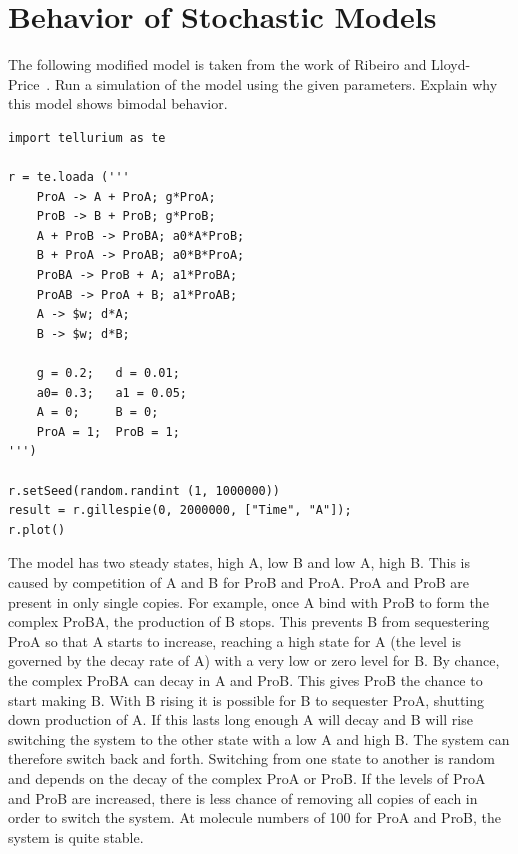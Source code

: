 \documentclass[12pt]{article}
\begin{document}


\section{Behavior of Stochastic Models}



\cprotEnv\begin{question}
The following modified model is taken from the work of Ribeiro and Lloyd-Price~\cite{ribeiro2007}. Run a simulation of the model using the given parameters. Explain why this model shows bimodal behavior.

\begin{verbatim}
import tellurium as te

r = te.loada ('''
    ProA -> A + ProA; g*ProA;
    ProB -> B + ProB; g*ProB;
    A + ProB -> ProBA; a0*A*ProB;
    B + ProA -> ProAB; a0*B*ProA;
    ProBA -> ProB + A; a1*ProBA;
    ProAB -> ProA + B; a1*ProAB;
    A -> $w; d*A;
    B -> $w; d*B;

    g = 0.2;   d = 0.01;
    a0= 0.3;   a1 = 0.05;
    A = 0;     B = 0;
    ProA = 1;  ProB = 1;
''')

r.setSeed(random.randint (1, 1000000))
result = r.gillespie(0, 2000000, ["Time", "A"]);
r.plot()
\end{verbatim}
\end{question}
\begin{solution}
The model has two steady states, high A, low B and low A, high B. This is caused by competition of A and B for ProB and ProA. ProA and ProB are present in only single copies. For example, once A bind with ProB to form the complex ProBA, the production of B stops. This prevents B from sequestering ProA so that A starts to increase, reaching a high state for A (the level is governed by the decay rate of A) with a very low or zero level for B. By chance, the complex ProBA can decay in A and ProB. This gives ProB the chance to start making B. With B rising it is possible for B to sequester ProA, shutting down production of A. If this lasts long enough A will decay and B will rise switching the system to the other state with a low A and high B. The system can therefore switch back and forth. Switching from one state to another is random and depends on the decay of the complex ProA or ProB. If the levels of ProA and ProB are increased, there is less chance of removing all copies of each in order to switch the system. At molecule numbers of 100 for ProA and ProB, the system is quite stable.
\end{solution}
\end{document}
